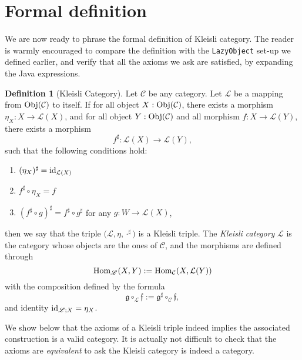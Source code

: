 \documentclass[12pt,a4paper]{report}
\theoremstyle{theorem}
\theoremstyle{definition}
\newtheorem{definition}{Definition}
\begin{document}
\section{Formal definition}

We are now ready to phrase the formal definition of
Kleisli category. The reader is warmly encouraged
to compare the definition with
the \lstinline{LazyObject}{} set-up we defined earlier,
and verify that all the axioms we ask are satisfied,
by expanding the Java expressions.

\begin{definition}[Kleisli Category]
Let $\mathcal{C}$ be any category. Let
$\mathcal{L}$ be a mapping from ${\rm Obj}(\mathcal{C})$ to itself.
If for all object $X:{\rm Obj}(\mathcal{C})$,
there exists a morphism $\eta_X:X\to \mathcal{L}(X)$,
and for all object $Y:{\rm Obj}(\mathcal{C})$
and all morphism $f:X\to\mathcal{L}(Y)$, there exists a
morphism
	\[ f^\sharp : \mathcal{L}(X)\to\mathcal{L}(Y) ,\]
such that the following conditions hold:
	\begin{enumerate}
		\item $(\eta_X)^\sharp = {\rm id}_{\mathcal{L}(X)}$
		\item $f^\sharp\circ \eta_X = f$
		\item $(f^\sharp \circ g)^\sharp = f^\sharp \circ g^\sharp$
		for any $g:W\to\mathcal{L}(X)$,
	\end{enumerate}
then we say that the triple $\big(\mathcal{L},\eta,\cdot^\sharp\big)$
is a Kleisli triple. The \emph{Kleisli category} $\mathscr{L}$ 
is the category whose objects
are the ones of $\mathcal{C}$, and the morphisms are defined
through
	\[ {\rm Hom}_{\mathscr{L}}(X,Y) := {\rm Hom}_{\mathcal{C}}(X,\mathcal{L}(Y)) \]
with the composition defined by the formula
	\[ \mathfrak{g}\circ_{\mathscr{L}}\mathfrak{f}
		:= \mathfrak{g}^\sharp \circ_{\mathcal{C}} \mathfrak{f} ,\]
and identity ${\rm id}_{\mathscr{L}; X}=\eta_X$.
\end{definition}
We show below that the axioms of a Kleisli triple indeed implies
the associated construction is a valid category.
It is actually not difficult to check that the axioms are
\emph{equivalent} to ask the Kleisli category is indeed a category.
\end{document}
